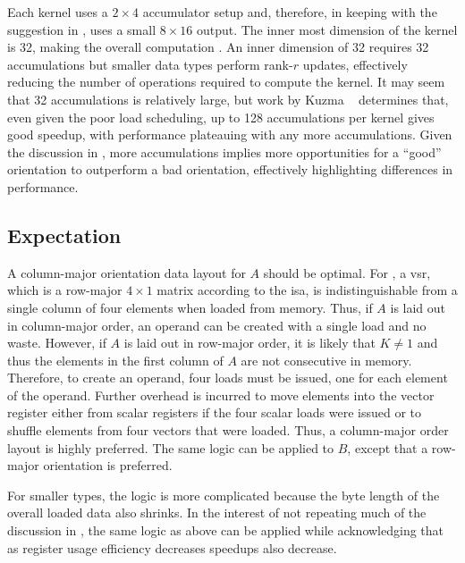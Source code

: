 \documentclass[\main/thesis.tex]{subfiles}
\begin{document}
Each kernel uses a $2 \times 4$ accumulator setup and, therefore, in keeping with the suggestion in , uses a small $8 \times 16$ output.
The inner most dimension of the kernel is 32, making the overall computation .
An inner dimension of 32 requires 32 accumulations but smaller data types perform rank-$r$ updates, effectively reducing the number of operations required to compute the kernel.
It may seem that 32 accumulations is relatively large, but work by Kuzma \etal~\autocite{kuzma2021fast} determines that, even given the poor load scheduling, up to 128 accumulations per kernel gives good speedup, with performance plateauing with any more accumulations.
Given the discussion in , more accumulations implies more opportunities for a ``good'' orientation to outperform a bad orientation, effectively highlighting differences in performance.

\subsection{Expectation}
\label{sec:orderExpectation}
A column-major orientation data layout for $A$ should be optimal.
For , a \gls{vsr}, which is a row-major $4 \times 1$ matrix according to the \gls{isa}, is indistinguishable from a single column of four elements when loaded from memory.
Thus, if $A$ is laid out in column-major order, an operand can be created with a single load and no waste.
However, if $A$ is laid out in row-major order, it is likely that $K \ne 1$ and thus the elements in the first column of $A$ are not consecutive in memory.
Therefore, to create an operand, four loads must be issued, one for each element of the operand.
Further overhead is incurred to move elements into the vector register either from scalar registers if the four scalar loads were issued or to shuffle elements from four vectors that were loaded.
Thus, a column-major order layout is highly preferred.
The same logic can be applied to $B$, except that a row-major orientation is preferred.

For smaller types, the logic is more complicated because the byte length of the overall loaded data also shrinks.
In the interest of not repeating much of the discussion in , the same logic as above can be applied while acknowledging that as register usage efficiency decreases speedups also decrease.
\end{document}
